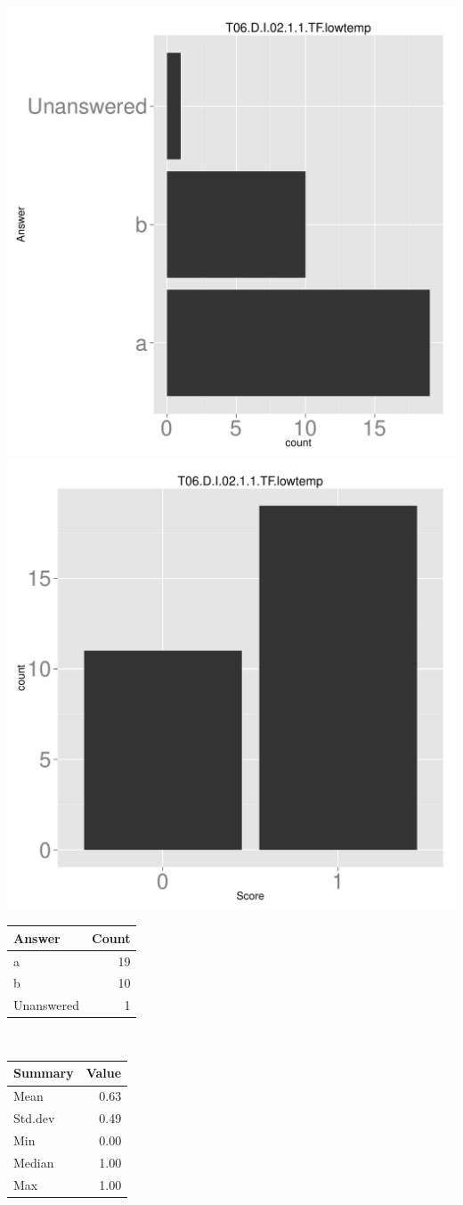 \documentclass[12pt,english,nohyper]{tufte-handout}\usepackage[]{graphicx}\usepackage[]{color}
\begin{document}
\begin{center} \includegraphics[width=.45\linewidth]{Topic06_AB_22_answer} \includegraphics[width=.45\linewidth]{Topic06_AB_22_score} \end{center} 

\begin{center}%
\begin{tabular}{lr}
  \hline
Answer & Count \\ 
  \hline
a &  19 \\ 
  b &  10 \\ 
  Unanswered &   1 \\ 
   \hline
\end{tabular}
~~~~~~~~%
\begin{tabular}{lr}
  \hline
Summary & Value \\ 
  \hline
Mean & 0.63 \\ 
  Std.dev & 0.49 \\ 
  Min & 0.00 \\ 
  Median & 1.00 \\ 
  Max & 1.00 \\ 
   \hline
\end{tabular}
\end{center}\newpage{}
\end{document}
